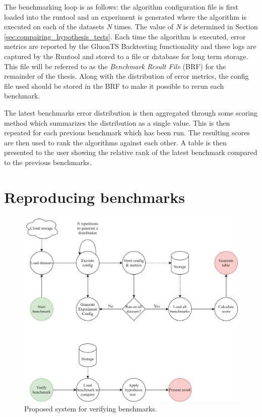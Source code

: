 The benchmarking loop is as follows: the algorithm configuration file is first loaded into the runtool and an experiment is generated where the algorithm is executed on each of the datasets \textit{N} times. The value of \textit{N} is determined in Section \ref{sec:compairing_hypothesis_tests}. Each time the algorithm is executed, error metrics are reported by the GluonTS Backtesting functionality and these logs are captured by the Runtool and stored to a file or database for long term storage. This file will be referred to as the \textit{Benchmark Result File} (BRF) for the remainder of the thesis. Along with the distribution of error metrics, the config file used should be stored in the BRF to make it possible to rerun each benchmark.

The latest benchmarks error distribution is then aggregated through some scoring method which summarizes the distribution as a single value. This is then repeated for each previous benchmark which has been run. The resulting scores are then used to rank the algorithms against each other. A table is then presented to the user showing the relative rank of the latest benchmark compared to the previous benchmarks.

\section{Reproducing benchmarks}
\begin{figure}[h]
  \centering
  \includegraphics[width=\linewidth]{./img/verify_benchmarks.png}
  \caption{Proposed system for verifying benchmarks.}
  \label{fig:proposed_validation_system}
\end{figure}

